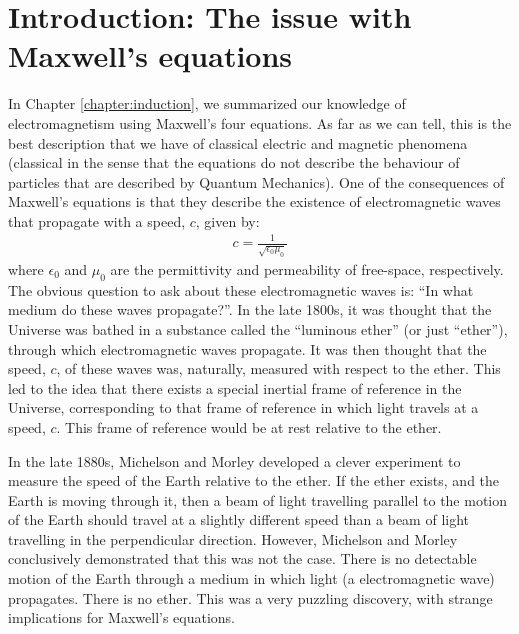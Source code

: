 \section{Introduction: The issue with Maxwell's equations}
In Chapter \ref{chapter:induction}, we summarized our knowledge of electromagnetism using Maxwell's four equations. As far as we can tell, this is the best description that we have of classical electric and magnetic phenomena (classical in the sense that the equations do not describe the behaviour of particles that are described by Quantum Mechanics). One of the consequences of Maxwell's equations is that they describe the existence of electromagnetic waves that propagate with a speed, $c$, given by:
\begin{align*}
c = \frac{1}{\sqrt{\epsilon_0\mu_0}}
\end{align*} 
where $\epsilon_0$ and $\mu_0$ are the permittivity and permeability of free-space, respectively. The obvious question to ask about these electromagnetic waves is: ``In what medium do these waves propagate?''. In the late 1800s, it was thought that the Universe was bathed in a substance called the ``luminous ether'' (or just ``ether''), through which electromagnetic waves propagate. It was then thought that the speed, $c$, of these waves was, naturally, measured with respect to the ether. This led to the idea that there exists a special inertial frame of reference in the Universe, corresponding to that frame of reference in which light travels at a speed, $c$. This frame of reference would be at rest relative to the ether.

In the late 1880s, Michelson and Morley developed a clever experiment to measure the speed of the Earth relative to the ether. If the ether exists, and the Earth is moving through it, then a beam of light travelling parallel to the motion of the Earth should travel at a slightly different speed than a beam of light travelling in the perpendicular direction. However, Michelson and Morley conclusively demonstrated that this was not the case. There is no detectable motion of the Earth through a medium in which light (a electromagnetic wave) propagates. There is no ether. This was a very puzzling discovery, with strange implications for Maxwell's equations. 

